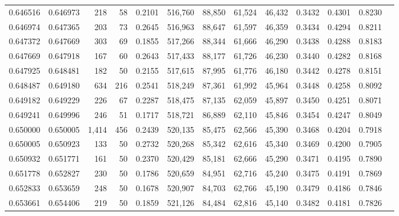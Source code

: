 \begin{tabular}{rrrrrrrrrrrrr}
0.646516 & 0.646973 &   218 &  58 &                                     0.2101 & 516,760 &  88,850 &  61,524 &  46,432 & 0.3432 & 0.4301 & 0.8230 \\
0.646974 & 0.647365 &   203 &  73 &                                     0.2645 & 516,963 &  88,647 &  61,597 &  46,359 & 0.3434 & 0.4294 & 0.8211 \\
0.647372 & 0.647669 &   303 &  69 &                                     0.1855 & 517,266 &  88,344 &  61,666 &  46,290 & 0.3438 & 0.4288 & 0.8183 \\
0.647669 & 0.647918 &   167 &  60 &                                     0.2643 & 517,433 &  88,177 &  61,726 &  46,230 & 0.3440 & 0.4282 & 0.8168 \\
0.647925 & 0.648481 &   182 &  50 &                                     0.2155 & 517,615 &  87,995 &  61,776 &  46,180 & 0.3442 & 0.4278 & 0.8151 \\
0.648487 & 0.649180 &   634 & 216 &                                     0.2541 & 518,249 &  87,361 &  61,992 &  45,964 & 0.3448 & 0.4258 & 0.8092 \\
0.649182 & 0.649229 &   226 &  67 &                                     0.2287 & 518,475 &  87,135 &  62,059 &  45,897 & 0.3450 & 0.4251 & 0.8071 \\
0.649241 & 0.649996 &   246 &  51 &                                     0.1717 & 518,721 &  86,889 &  62,110 &  45,846 & 0.3454 & 0.4247 & 0.8049 \\
0.650000 & 0.650005 & 1,414 & 456 &                                     0.2439 & 520,135 &  85,475 &  62,566 &  45,390 & 0.3468 & 0.4204 & 0.7918 \\
0.650005 & 0.650923 &   133 &  50 &                                     0.2732 & 520,268 &  85,342 &  62,616 &  45,340 & 0.3469 & 0.4200 & 0.7905 \\
0.650932 & 0.651771 &   161 &  50 &                                     0.2370 & 520,429 &  85,181 &  62,666 &  45,290 & 0.3471 & 0.4195 & 0.7890 \\
0.651778 & 0.652827 &   230 &  50 &                                     0.1786 & 520,659 &  84,951 &  62,716 &  45,240 & 0.3475 & 0.4191 & 0.7869 \\
0.652833 & 0.653659 &   248 &  50 &                                     0.1678 & 520,907 &  84,703 &  62,766 &  45,190 & 0.3479 & 0.4186 & 0.7846 \\
0.653661 & 0.654406 &   219 &  50 &                                     0.1859 & 521,126 &  84,484 &  62,816 &  45,140 & 0.3482 & 0.4181 & 0.7826 \\

\end{tabular}
